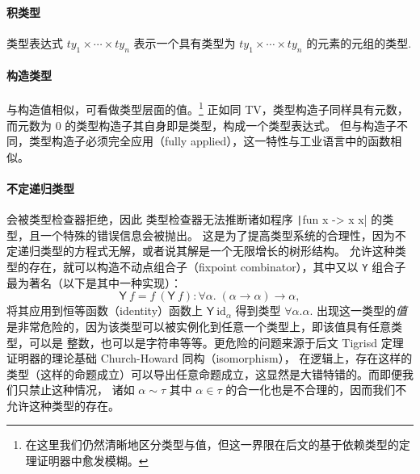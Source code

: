 \documentclass[a4paper, 11pt]{article}
\theoremstyle{remark}\newtheorem*{remark}{Remark}
\theoremstyle{definition}\newtheorem*{definition}{Definition}
\begin{document}
\paragraph*{积类型}
类型表达式 \(ty_1\times\cdots\times ty_n\) 表示一个具有类型为 \(ty_1\times\cdots\times ty_n\) 的元素的元组的类型.
\paragraph*{构造类型} 与构造值相似，可看做类型层面的值。\footnote{在这里我们仍然清晰地区分类型与值，但这一界限在后文的基于依赖类型的定理证明器中愈发模糊。}
正如同 TV，类型构造子同样具有元数，而元数为 0 的类型构造子其自身即是类型，构成一个类型表达式。
但与构造子不同，类型构造子必须完全应用（fully applied），这一特性与工业语言中的函数相似。
\paragraph*{不定递归类型}\label{para:equirecursive} 会被类型检查器拒绝，因此
类型检查器无法推断诸如程序 \texttt|fun x -> x x| 的类型，且一个特殊的错误信息会被抛出。
这是为了提高类型系统的合理性，因为不定递归类型的方程式无解，或者说其解是一个无限增长的树形结构。
允许这种类型的存在，就可以构造不动点组合子（fixpoint combinator），其中又以 \texttt{Y} 组合子最为著名（以下是其中一种实现）：
\[
  \mathsf{Y}\ f = f\ (\mathsf{Y}\ f) : \forall \alpha.\;(\alpha\to\alpha)\to\alpha,
\]
将其应用到恒等函数（identity）函数上 $\mathsf{Y}\ \mathrm{id}_\alpha$ 得到类型 $\forall \alpha. \alpha$.
出现这一类型的\emph{值}是非常危险的，因为该类型可以被实例化到任意一个类型上，即该值具有任意类型，可以是
整数，也可以是字符串等等。更危险的问题来源于后文 Tigrisd 定理证明器的理论基础 Church-Howard 同构（isomorphism），
在逻辑上，存在这样的类型（这样的命题成立）可以导出任意命题成立，这显然是大错特错的。而即便我们只禁止这种情况，
诸如 $\alpha\sim\tau$ 其中 $\alpha\in\tau$ 的合一化也是不合理的，因而我们不允许这种类型的存在。
\end{document}
